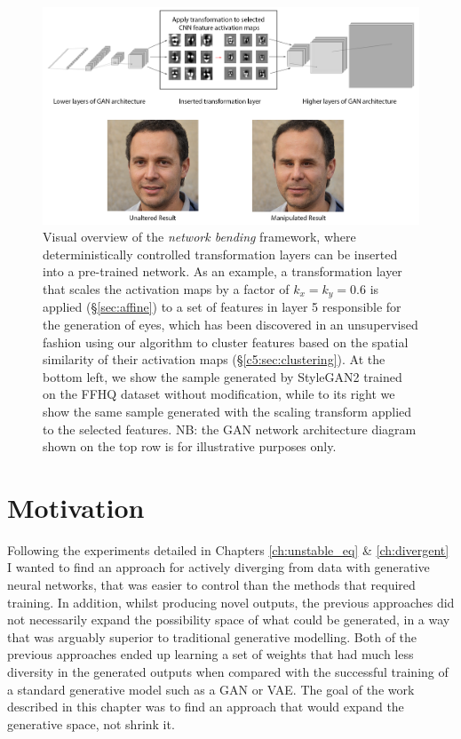 \begin{figure}[!htb]
    \centering
    \includegraphics[width=1\textwidth]{figures/c5_netbend/misc/network-bending-diagram.png}
    \caption[Visual overview of the \textit{network bending} framework]{Visual overview of the \textit{network bending} framework, where deterministically controlled transformation layers can be inserted into a pre-trained network. As an example, a transformation layer that scales the activation maps by a factor of $k_x=k_y=0.6$ is applied (\S\ref{sec:affine}) to a set of features in layer 5 responsible for the generation of eyes, which has been discovered in an unsupervised fashion using our algorithm to cluster features based on the spatial similarity of their activation maps (\S \ref{c5:sec:clustering}). At the bottom left, we show the sample generated by StyleGAN2 \citep{karras2019analyzing} trained on the FFHQ dataset without modification, while to its right we show the same sample generated with the scaling transform applied to the selected features. NB: the GAN network architecture diagram shown on the top row is for illustrative purposes only.}
    \label{fig:c5:overview_diagram}
\end{figure}

\section{Motivation}

Following the experiments detailed in Chapters \ref{ch:unstable_eq} \& \ref{ch:divergent} I wanted to find an approach for actively diverging from data with generative neural networks, that was easier to control than the methods that required training.
In addition, whilst producing novel outputs, the previous approaches did not necessarily expand the possibility space of what could be generated, in a way that was arguably superior to traditional generative modelling.
Both of the previous approaches ended up learning a set of weights that had much less diversity in the generated outputs when compared with the successful training of a standard generative model such as a GAN or VAE. 
The goal of the work described in this chapter was to find an approach that would expand the generative space, not shrink it. 


